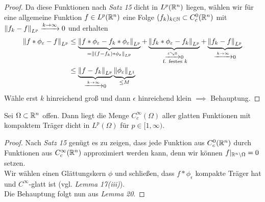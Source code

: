 \documentclass[skript.tex]{subfiles}
\begin{document}
\begin{proof}
		Da diese Funktionen nach \emph{Satz 15} dicht in $L^p(\mathbb{R}^n)$ liegen, wählen wir für eine allgemeine Funktion $f \in L^p(\mathbb{R}^n)$ eine Folge $(f_k)_{k\in\mathbb{N}} \subset C_c^0(\mathbb{R}^n)$ mit $\left\lVert f_k-f \right\rVert_{L^p} \xrightarrow{k\to\infty} 0$ und erhalten
		\begin{align*}
			\left\lVert f\ast\phi_\varepsilon-f \right\rVert_{L^p} &\leq \underbrace{\left\lVert f\ast\phi_\varepsilon-f_k\ast\phi_\varepsilon \right\rVert_{L^p}}_{=\left\lVert (f-f_k)\ast\phi_\varepsilon \right\rVert_{L^p}}
			+\underbrace{\left\lVert f_k\ast\phi_\varepsilon-f_k \right\rVert_{L^p}}_{\substack{\xrightarrow{\varepsilon\searrow 0} 0\\\text{ f. festes $k$}}}
			+\underbrace{\left\lVert f_k-f \right\rVert_{L^p}}_{\xrightarrow{k\to\infty} 0}\\
			&\leq \underbrace{\left\lVert f-f_k \right\rVert_{L^p}}_{\xrightarrow{k\to\infty} 0}
			\underbrace{\left\lVert \phi_\varepsilon \right\rVert_{L^1}}_{\leq M}
		\end{align*}
		Wähle erst $k$ hinreichend groß und dann $\epsilon$ hinreichend klein $\implies$ Behauptung.
	\end{proof}

	\begin{theorem}
		Sei $\Omega\subset\mathbb{R}^n$ offen. Dann liegt die Menge $C_c^\infty(\Omega)$ aller glatten Funktionen mit kompaktem Träger dicht in $L^p(\Omega)$ für $p\in[1,\infty)$.
	\end{theorem}
	\begin{proof}
		Nach \emph{Satz 15} genügt es zu zeigen, dass jede Funktion aus $C_c^0(\mathbb{R}^n)$ durch Funktionen aus $C_c^\infty(\mathbb{R}^n)$ approximiert werden kann, denn wir können $f\vert_{\mathbb{R}^n\setminus\Omega} = 0$ setzen.\\
		Wir wählen einen Glättungskern $\phi$ und schließen, dass $f\ast\phi_\epsilon$ kompakte Träger hat und $C^\infty$-glatt ist (vgl. \emph{Lemma 17(iii)}).\\
		Die Behauptung folgt nun aus \emph{Lemma 20}.
	\end{proof}
	
\end{document}
